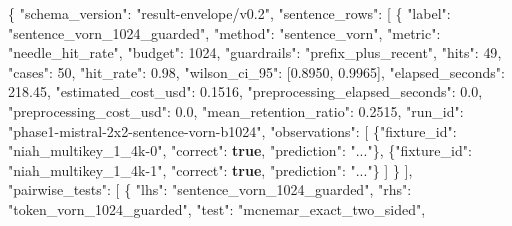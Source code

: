 \documentclass[10pt]{article}
\newenvironment{Shaded}{}{}
\newcommand{\DataTypeTok}[1]{\textcolor[rgb]{0.56,0.13,0.00}{#1}}
\newcommand{\DecValTok}[1]{\textcolor[rgb]{0.25,0.63,0.44}{#1}}
\newcommand{\FloatTok}[1]{\textcolor[rgb]{0.25,0.63,0.44}{#1}}
\newcommand{\FunctionTok}[1]{\textcolor[rgb]{0.02,0.16,0.49}{#1}}
\newcommand{\KeywordTok}[1]{\textcolor[rgb]{0.00,0.44,0.13}{\textbf{#1}}}
\newcommand{\OtherTok}[1]{\textcolor[rgb]{0.00,0.44,0.13}{#1}}
\newcommand{\StringTok}[1]{\textcolor[rgb]{0.25,0.44,0.63}{#1}}
\begin{document}
\begin{Shaded}
\begin{Highlighting}[]
\FunctionTok{\{}
 \DataTypeTok{"schema\_version"}\FunctionTok{:} \StringTok{"result{-}envelope/v0.2"}\FunctionTok{,}
 \DataTypeTok{"sentence\_rows"}\FunctionTok{:} \OtherTok{[}
 \FunctionTok{\{}
 \DataTypeTok{"label"}\FunctionTok{:} \StringTok{"sentence\_vorn\_1024\_guarded"}\FunctionTok{,}
 \DataTypeTok{"method"}\FunctionTok{:} \StringTok{"sentence\_vorn"}\FunctionTok{,}
 \DataTypeTok{"metric"}\FunctionTok{:} \StringTok{"needle\_hit\_rate"}\FunctionTok{,}
 \DataTypeTok{"budget"}\FunctionTok{:} \DecValTok{1024}\FunctionTok{,}
 \DataTypeTok{"guardrails"}\FunctionTok{:} \StringTok{"prefix\_plus\_recent"}\FunctionTok{,}
 \DataTypeTok{"hits"}\FunctionTok{:} \DecValTok{49}\FunctionTok{,}
 \DataTypeTok{"cases"}\FunctionTok{:} \DecValTok{50}\FunctionTok{,}
 \DataTypeTok{"hit\_rate"}\FunctionTok{:} \FloatTok{0.98}\FunctionTok{,}
 \DataTypeTok{"wilson\_ci\_95"}\FunctionTok{:} \OtherTok{[}\FloatTok{0.8950}\OtherTok{,} \FloatTok{0.9965}\OtherTok{]}\FunctionTok{,}
 \DataTypeTok{"elapsed\_seconds"}\FunctionTok{:} \FloatTok{218.45}\FunctionTok{,}
 \DataTypeTok{"estimated\_cost\_usd"}\FunctionTok{:} \FloatTok{0.1516}\FunctionTok{,}
 \DataTypeTok{"preprocessing\_elapsed\_seconds"}\FunctionTok{:} \FloatTok{0.0}\FunctionTok{,}
 \DataTypeTok{"preprocessing\_cost\_usd"}\FunctionTok{:} \FloatTok{0.0}\FunctionTok{,}
 \DataTypeTok{"mean\_retention\_ratio"}\FunctionTok{:} \FloatTok{0.2515}\FunctionTok{,}
 \DataTypeTok{"run\_id"}\FunctionTok{:} \StringTok{"phase1{-}mistral{-}2x2{-}sentence{-}vorn{-}b1024"}\FunctionTok{,}
 \DataTypeTok{"observations"}\FunctionTok{:} \OtherTok{[}
 \FunctionTok{\{}\DataTypeTok{"fixture\_id"}\FunctionTok{:} \StringTok{"niah\_multikey\_1\_4k{-}0"}\FunctionTok{,} \DataTypeTok{"correct"}\FunctionTok{:} \KeywordTok{true}\FunctionTok{,} \DataTypeTok{"prediction"}\FunctionTok{:} \StringTok{"..."}\FunctionTok{\}}\OtherTok{,}
 \FunctionTok{\{}\DataTypeTok{"fixture\_id"}\FunctionTok{:} \StringTok{"niah\_multikey\_1\_4k{-}1"}\FunctionTok{,} \DataTypeTok{"correct"}\FunctionTok{:} \KeywordTok{true}\FunctionTok{,} \DataTypeTok{"prediction"}\FunctionTok{:} \StringTok{"..."}\FunctionTok{\}}
 \OtherTok{]}
 \FunctionTok{\}}
 \OtherTok{]}\FunctionTok{,}
 \DataTypeTok{"pairwise\_tests"}\FunctionTok{:} \OtherTok{[}
 \FunctionTok{\{}
 \DataTypeTok{"lhs"}\FunctionTok{:} \StringTok{"sentence\_vorn\_1024\_guarded"}\FunctionTok{,}
 \DataTypeTok{"rhs"}\FunctionTok{:} \StringTok{"token\_vorn\_1024\_guarded"}\FunctionTok{,}
 \DataTypeTok{"test"}\FunctionTok{:} \StringTok{"mcnemar\_exact\_two\_sided"}\FunctionTok{,}

\end{Highlighting}
\end{Shaded}
\end{document}
